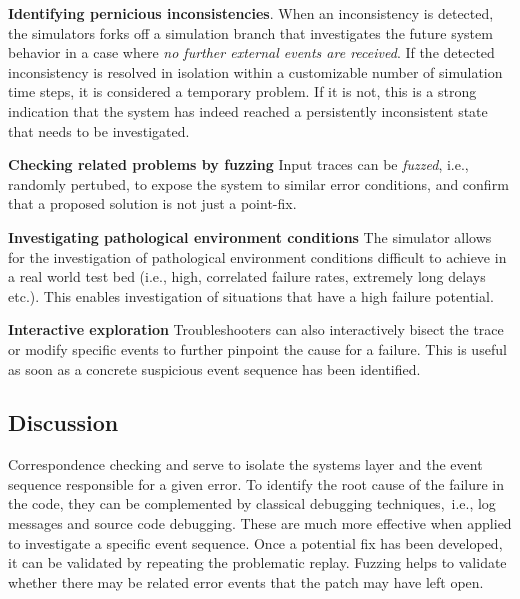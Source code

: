 \textbf{Identifying pernicious inconsistencies}. When an inconsistency is detected,
the simulators forks off a simulation branch that investigates the future system behavior
in a case where \emph{no further external events are received}. If the detected inconsistency
is resolved in isolation within a customizable number of simulation time steps, it is considered
a temporary problem. If it is not, this is a strong indication that the system has indeed
reached a persistently inconsistent state that needs to be investigated.

\textbf{Checking related problems by fuzzing} Input traces can be \emph{fuzzed}, i.e.,
randomly pertubed, to expose the system to similar error conditions, and confirm
that a proposed solution is not just a point-fix.

\textbf{Investigating pathological environment conditions} The simulator allows for the investigation
of pathological environment conditions difficult to achieve in a real world test bed
(i.e., high, correlated failure rates, extremely long delays etc.). This enables
investigation of situations that have a high failure potential.

\textbf{Interactive exploration} Troubleshooters can also interactively bisect
the trace or modify specific events to further pinpoint the cause for a failure.
This is useful as soon as a concrete suspicious event sequence has been identified.

\subsection{Discussion}
Correspondence checking and \simulator{} serve to isolate the systems layer and
the event sequence responsible for a given error. To identify the root cause of
the failure in the code, they can be complemented by classical debugging
techniques,~i.e., log messages and source code debugging. These are much more
effective when applied to investigate a specific event sequence. Once a
potential fix has been developed, it can be validated by repeating the
problematic replay. Fuzzing helps to validate whether there may be
related error events that the patch may have left open.


